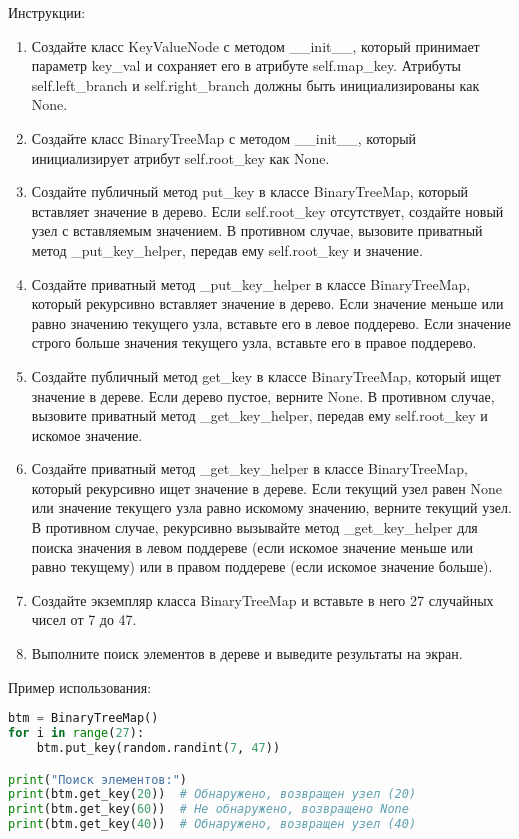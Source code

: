 \begin{enumerate}
Инструкции:
\begin{enumerate}
    \item Создайте класс KeyValueNode с методом \_\_init\_\_, который принимает параметр key\_val и сохраняет его в атрибуте self.map\_key. Атрибуты self.left\_branch и self.right\_branch должны быть инициализированы как None.
    \item Создайте класс BinaryTreeMap с методом \_\_init\_\_, который инициализирует атрибут self.root\_key как None.
    \item Создайте публичный метод put\_key в классе BinaryTreeMap, который вставляет значение в дерево. Если self.root\_key отсутствует, создайте новый узел с вставляемым значением. В противном случае, вызовите приватный метод \_put\_key\_helper, передав ему self.root\_key и значение.
    \item Создайте приватный метод \_put\_key\_helper в классе BinaryTreeMap, который рекурсивно вставляет значение в дерево. Если значение меньше или равно значению текущего узла, вставьте его в левое поддерево. Если значение строго больше значения текущего узла, вставьте его в правое поддерево.
    \item Создайте публичный метод get\_key в классе BinaryTreeMap, который ищет значение в дереве. Если дерево пустое, верните None. В противном случае, вызовите приватный метод \_get\_key\_helper, передав ему self.root\_key и искомое значение.
    \item Создайте приватный метод \_get\_key\_helper в классе BinaryTreeMap, который рекурсивно ищет значение в дереве. Если текущий узел равен None или значение текущего узла равно искомому значению, верните текущий узел. В противном случае, рекурсивно вызывайте метод \_get\_key\_helper для поиска значения в левом поддереве (если искомое значение меньше или равно текущему) или в правом поддереве (если искомое значение больше).
    \item Создайте экземпляр класса BinaryTreeMap и вставьте в него 27 случайных чисел от 7 до 47.
    \item Выполните поиск элементов в дереве и выведите результаты на экран.
\end{enumerate}

Пример использования:
\begin{lstlisting}[language=Python]
btm = BinaryTreeMap()
for i in range(27):
    btm.put_key(random.randint(7, 47))

print("Поиск элементов:")
print(btm.get_key(20))  # Обнаружено, возвращен узел (20)
print(btm.get_key(60))  # Не обнаружено, возвращено None
print(btm.get_key(40))  # Обнаружено, возвращен узел (40)
\end{lstlisting}


\end{enumerate}
